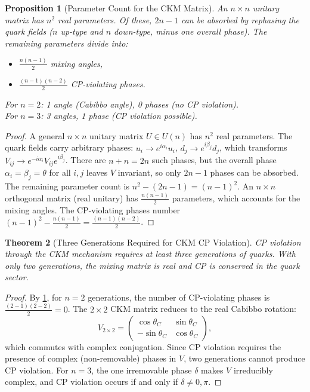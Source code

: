 \documentclass[12pt]{article}
\newtheorem{theorem}{Theorem}[section]
\newtheorem{proposition}[theorem]{Proposition}
\theoremstyle{definition}
\theoremstyle{remark}
\begin{document}
\begin{proposition}[Parameter Count for the CKM Matrix]
\label{prop:ckm_params}
An $n \times n$ unitary matrix has $n^2$ real parameters. Of these, $2n - 1$ can be
absorbed by rephasing the quark fields ($n$ up-type and $n$ down-type, minus one overall
phase). The remaining parameters divide into:
\begin{itemize}
    \item $\frac{n(n-1)}{2}$ mixing angles,
    \item $\frac{(n-1)(n-2)}{2}$ CP-violating phases.
\end{itemize}
For $n = 2$: 1 angle (Cabibbo angle), 0 phases (no CP violation).\\
For $n = 3$: 3 angles, 1 phase (CP violation possible).
\end{proposition}

\begin{proof}
A general $n \times n$ unitary matrix $U \in U(n)$ has $n^2$ real parameters.
The quark fields carry arbitrary phases: $u_i \to e^{i\alpha_i} u_i$,
$d_j \to e^{i\beta_j} d_j$, which transforms $V_{ij} \to e^{-i\alpha_i} V_{ij} e^{i\beta_j}$.
There are $n + n = 2n$ such phases, but the overall phase
$\alpha_i = \beta_j = \theta$ for all $i,j$ leaves $V$ invariant, so only $2n - 1$
phases can be absorbed. The remaining parameter count is
$n^2 - (2n-1) = (n-1)^2$. An $n \times n$ orthogonal matrix (real unitary) has
$\frac{n(n-1)}{2}$ parameters, which accounts for the mixing angles. The CP-violating
phases number $(n-1)^2 - \frac{n(n-1)}{2} = \frac{(n-1)(n-2)}{2}$.
\end{proof}

\begin{theorem}[Three Generations Required for CKM CP Violation]
\label{thm:three_gen}
CP violation through the CKM mechanism requires at least three generations of quarks.
With only two generations, the mixing matrix is real and CP is conserved in the quark sector.
\end{theorem}

\begin{proof}
By \cref{prop:ckm_params}, for $n = 2$ generations, the number of CP-violating
phases is $\frac{(2-1)(2-2)}{2} = 0$. The $2 \times 2$ CKM matrix reduces to
the real Cabibbo rotation:
\begin{equation}
V_{2\times 2} = \begin{pmatrix} \cos\theta_C & \sin\theta_C \\ -\sin\theta_C & \cos\theta_C \end{pmatrix},
\end{equation}
which commutes with complex conjugation. Since CP violation requires the presence of
complex (non-removable) phases in $V$, two generations cannot produce CP violation.
For $n = 3$, the one irremovable phase $\delta$ makes $V$ irreducibly complex, and
CP violation occurs if and only if $\delta \neq 0, \pi$.
\end{proof}
\end{document}
